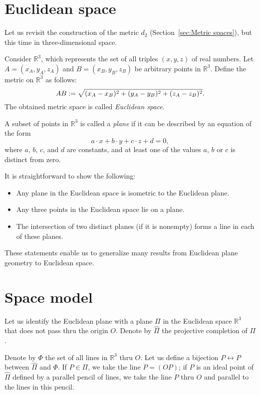 \section{Euclidean space}

Let us revisit the construction of the metric $d_2$ (Section~\ref{sec:Metric spaces}), but this time in three-dimensional space.

Consider $\mathbb{R}^3$, which represents the set of all triples $(x,y,z)$ of real numbers.
Let  $A=(x_A,y_A,z_A)$ and $B=(x_B,y_B,z_B)$ be arbitrary points in $\mathbb{R}^3$.
Define the metric on $\mathbb{R}^3$ as follows:
$$AB
:=
\sqrt{(x_A-x_B)^2+(y_A-y_B)^2+(z_A-z_B)^2}.$$
The obtained metric space is called \emph{Euclidean space}.

A subset of points in $\mathbb{R}^3$ is called a \emph{plane} if it can be
described by an equation of the form
$$a\cdot x+b\cdot y+c\cdot z+d=0,$$ 
where $a$, $b$, $c$, and $d$ are constants, and at least one of the values $a$, $b$ or $c$ is distinct from zero.

It is straightforward to show the following:
\begin{itemize}
 \item Any plane in the Euclidean space is isometric to the Euclidean plane.
 \item Any three points in the Euclidean space lie on a plane.
 \item The  intersection of two distinct planes (if it is nonempty) forms a line in each of these planes.
\end{itemize}

These statements enable us to generalize many results from Euclidean plane geometry to Euclidean space.

\section{Space model}

Let us identify the Euclidean plane with a plane $\Pi$ in the Euclidean space $\mathbb{R}^3$ that does not pass thru the origin $O$.
Denote by $\hat\Pi$ the projective completion of $\Pi$.

Denote by $\Phi$ the set of all lines in $\mathbb{R}^3$ thru $O$.
Let us define a bijection $P\leftrightarrow \dot P$ between $\hat \Pi$ and $\Phi$.
If $P\in \Pi$, we take the line $\dot P=(OP)$;
if $P$ is an ideal point of $\hat \Pi$ defined by a parallel pencil of lines, we take the line $\dot P$ thru $O$ and parallel to the lines in this pencil.

